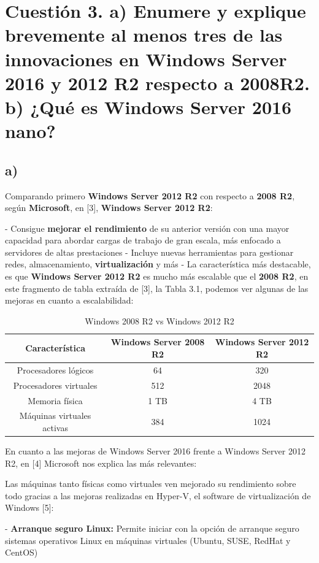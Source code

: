 \section{Cuestión 3. a) Enumere y explique brevemente al menos tres de las innovaciones en Windows Server 2016 y 2012 R2 respecto a 2008R2. b) ¿Qué es Windows Server 2016 nano?}

\subsection{a)} Comparando primero \textbf{Windows Server 2012 R2} con respecto a \textbf{2008 R2}, según \textbf{Microsoft}, en [3], \textbf{Windows Server 2012 R2}:

- Consigue \textbf{mejorar el rendimiento} de su anterior versión con una mayor capacidad para abordar cargas de trabajo de gran escala, más enfocado a servidores de altas prestaciones
- Incluye nuevas herramientas para gestionar redes, almacenamiento, \textbf{virtualización} y más
- La característica más destacable, es que \textbf{Windows Server 2012 R2} es mucho más escalable que el \textbf{2008 R2}, en este fragmento de tabla extraída de [3], la Tabla 3.1, podemos ver algunas de las mejoras en cuanto a escalabilidad:

\begin{table}[H]
\centering
\begin{tabular}{|c|c|c|}
\hline
\textbf{ Característica} & \textbf{Windows Server 2008 R2} & \textbf{Windows Server 2012 R2} \\
\hline
Procesadores lógicos & 64 & 320 \\
Procesadores virtuales & 512 & 2048 \\
Memoria física & 1 TB & 4 TB \\
Máquinas virtuales activas & 384 & 1024 \\
\hline
\end{tabular}  
\caption{Windows 2008 R2 vs Windows 2012 R2} \label{tab:ws2008vsws2012}
\end{table}

En cuanto a las mejoras de Windows Server 2016 frente a Windows Server 2012 R2, en [4] Microsoft nos explica las más relevantes:

Las máquinas tanto físicas como virtuales ven mejorado su rendimiento sobre todo gracias a las mejoras realizadas en Hyper-V, el software de virtualización de Windows [5]:\newline

-  \textbf{Arranque seguro Linux:} Permite iniciar con la opción de arranque seguro sistemas operativos Linux en máquinas virtuales (Ubuntu, SUSE, RedHat y CentOS)

